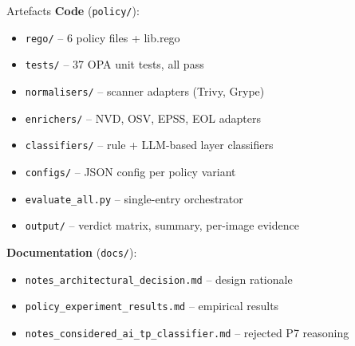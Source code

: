 \documentclass[aspectratio=169]{beamer}
\begin{document}
\begin{frame}{Artefacts}
\textbf{Code} (\texttt{policy/}):
\begin{itemize}
  \item \texttt{rego/} -- 6 policy files + lib.rego
  \item \texttt{tests/} -- 37 OPA unit tests, all pass
  \item \texttt{normalisers/} -- scanner adapters (Trivy, Grype)
  \item \texttt{enrichers/} -- NVD, OSV, EPSS, EOL adapters
  \item \texttt{classifiers/} -- rule + LLM-based layer classifiers
  \item \texttt{configs/} -- JSON config per policy variant
  \item \texttt{evaluate\_all.py} -- single-entry orchestrator
  \item \texttt{output/} -- verdict matrix, summary, per-image evidence
\end{itemize}

\medskip
\textbf{Documentation} (\texttt{docs/}):
\begin{itemize}
  \item \texttt{notes\_architectural\_decision.md} -- design rationale
  \item \texttt{policy\_experiment\_results.md} -- empirical results
  \item \texttt{notes\_considered\_ai\_tp\_classifier.md} -- rejected P7 reasoning
\end{itemize}
\end{frame}
\end{document}

